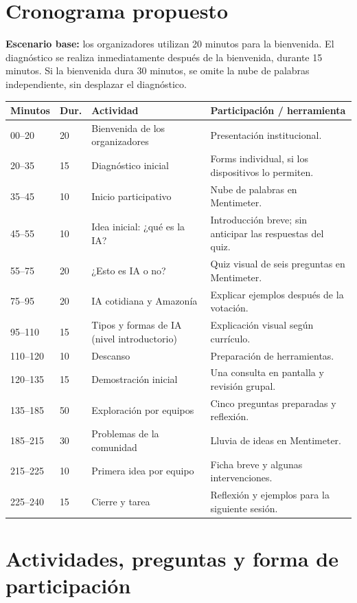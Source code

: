 \documentclass[11pt,a4paper]{article}
\begin{document}
\section{Cronograma propuesto}
\textbf{Escenario base:} los organizadores utilizan 20 minutos para la bienvenida. El diagnóstico se realiza inmediatamente después de la bienvenida, durante 15 minutos. Si la bienvenida dura 30 minutos, se omite la nube de palabras independiente, sin desplazar el diagnóstico.
\small
\begin{longtable}{@{}p{2.0cm}p{1.2cm}p{5cm}p{5.7cm}@{}}
\toprule \textbf{Minutos} & \textbf{Dur.} & \textbf{Actividad} & \textbf{Participación / herramienta}\\\midrule\endhead
00--20 & 20 & Bienvenida de los organizadores & Presentación institucional.\\
20--35 & 15 & Diagnóstico inicial & Forms individual, si los dispositivos lo permiten.\\
35--45 & 10 & Inicio participativo & Nube de palabras en Mentimeter.\\
45--55 & 10 & Idea inicial: ¿qué es la IA? & Introducción breve; sin anticipar las respuestas del quiz.\\
55--75 & 20 & ¿Esto es IA o no? & Quiz visual de seis preguntas en Mentimeter.\\
75--95 & 20 & IA cotidiana y Amazonía & Explicar ejemplos después de la votación.\\
95--110 & 15 & Tipos y formas de IA (nivel introductorio) & Explicación visual según currículo.\\
110--120 & 10 & Descanso & Preparación de herramientas.\\
120--135 & 15 & Demostración inicial & Una consulta en pantalla y revisión grupal.\\
135--185 & 50 & Exploración por equipos & Cinco preguntas preparadas y reflexión.\\
185--215 & 30 & Problemas de la comunidad & Lluvia de ideas en Mentimeter.\\
215--225 & 10 & Primera idea por equipo & Ficha breve y algunas intervenciones.\\
225--240 & 15 & Cierre y tarea & Reflexión y ejemplos para la siguiente sesión.\\
\bottomrule
\end{longtable}
\normalsize

\section{Actividades, preguntas y forma de participación}
\end{document}
